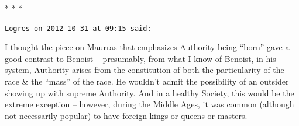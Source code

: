 
\begin{center}* * *\end{center}

\begin{footnotesize}
\begin{sffamily}
\texttt{Logres on 2012-10-31 at 09:15 said:}

I thought the piece on Maurras that emphasizes Authority being ``born'' gave a good contrast to Benoist -- presumably, from what I know of Benoist, in his system, Authority arises from the constitution of both the particularity of the race \& the ``mass'' of the race. He wouldn't admit the possibility of an outsider showing up with supreme Authority. And in a healthy Society, this would be the extreme exception -- however, during the Middle Ages, it was common (although not necessarily popular) to have foreign kings or queens or masters.


\hfill

\end{sffamily}
\end{footnotesize}

